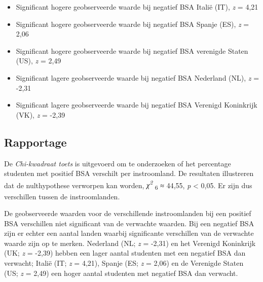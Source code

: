 \documentclass[
]{article}
\newenvironment{Shaded}{\begin{snugshade}}{\end{snugshade}}
\newcommand{\CommentTok}[1]{\textcolor[rgb]{0.56,0.35,0.01}{\textit{#1}}}
\newcommand{\KeywordTok}[1]{\textcolor[rgb]{0.13,0.29,0.53}{\textbf{#1}}}
\newcommand{\NormalTok}[1]{#1}
\newcommand{\OperatorTok}[1]{\textcolor[rgb]{0.81,0.36,0.00}{\textbf{#1}}}
\newcommand{\StringTok}[1]{\textcolor[rgb]{0.31,0.60,0.02}{#1}}
\providecommand{\tightlist}{%
  \setlength{\itemsep}{0pt}\setlength{\parskip}{0pt}}
\begin{document}
\begin{Shaded}
\end{Shaded}

\begin{itemize}
\tightlist
\item
  Significant hogere geobserveerde waarde bij negatief BSA Italië (IT),
  \emph{z} = 4,21
\item
  Significant hogere geobserveerde waarde bij negatief BSA Spanje (ES),
  \emph{z} = 2,06
\item
  Significant hogere geobserveerde waarde bij negatief BSA verenigde
  Staten (US), \emph{z} = 2,49
\item
  Significant lagere geobserveerde waarde bij negatief BSA Nederland
  (NL), \emph{z} = -2,31
\item
  Significant lagere geobserveerde waarde bij negatief BSA Verenigd
  Koninkrijk (VK), \emph{z} = -2,39
\end{itemize}

\hypertarget{rapportage}{%
\subsection{Rapportage}\label{rapportage}}

De \emph{Chi-kwadraat toets} is uitgevoerd om te onderzoeken of het
percentage studenten met positief BSA verschilt per instroomland. De
resultaten illustreren dat de nulthypothese verworpen kan worden,
\emph{χ\textsuperscript{2}} \textsubscript{6} ≈ 44,55, \emph{p}
\textless{} 0,05. Er zijn dus verschillen tussen de instroomlanden.

De geobserveerde waarden voor de verschillende instroomlanden bij een
positief BSA verschillen niet significant van de verwachte waarden. Bij
een negatief BSA zijn er echter een aantal landen waarbij significante
verschillen van de verwachte waarde zijn op te merken. Nederland (NL;
\emph{z} = -2,31) en het Verenigd Koninkrijk (UK; \emph{z} = -2,39)
hebben een lager aantal studenten met een negatief BSA dan verwacht;
Italië (IT; \emph{z} = 4,21), Spanje (ES; \emph{z} = 2,06) en de
Verenigde Staten (US; \emph{z} = 2,49) een hoger aantal studenten met
negatief BSA dan verwacht.
\end{document}
